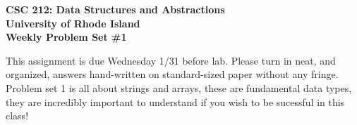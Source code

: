 \documentclass[11pt]{article}
\begin{document}
\thispagestyle{empty}

\begin{center}
    {\Large\bf CSC 212: Data Structures and Abstractions}\\
    \medskip
    {\Large\bf University of Rhode Island}\\
    \bigskip
    {\Large\bf Weekly Problem Set \#1}
\end{center}

\vspace{25pt}

This assignment is due Wednesday 1/31 before lab. Please turn in neat, and organized, answers hand-written on standard-sized paper without any fringe. Problem set 1 is all about strings and arrays, these are fundamental data types, they are incredibly important to understand if you wish to be sucessful in this class! 
\end{document}
